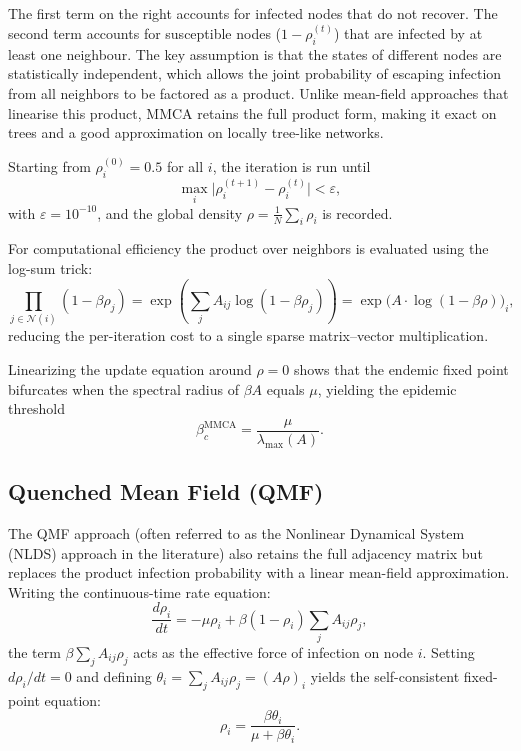 \documentclass{article}
\begin{document}
The first term on the right accounts for infected nodes that do not recover. The second term accounts for susceptible nodes ($1 - \rho_i^{(t)}$) that are infected by at least one neighbour. The key assumption is that the states of different nodes are statistically independent, which allows the joint probability of escaping infection from all neighbors to be factored as a product. Unlike mean-field approaches that linearise this product, MMCA retains the full product form, making it exact on trees and a good approximation on locally tree-like networks.

Starting from $\rho_i^{(0)} = 0.5$ for all $i$, the iteration is run until
\begin{equation}
    \max_i \bigl|\rho_i^{(t+1)} - \rho_i^{(t)}\bigr| < \varepsilon,
\end{equation}
with $\varepsilon = 10^{-10}$, and the global density $\rho = \tfrac{1}{N}\sum_i \rho_i$ is recorded.

For computational efficiency the product over neighbors is evaluated using the log-sum trick:
\begin{equation}
    \prod_{j \in \mathcal{N}(i)} (1 - \beta\rho_j)
    = \exp\!\left(\sum_j A_{ij}\log(1 - \beta\rho_j)\right)
    = \exp\!\bigl(A \cdot \log(1 - \beta\rho)\bigr)_i,
\end{equation}
reducing the per-iteration cost to a single sparse matrix--vector multiplication.

Linearizing the update equation around $\rho = 0$ shows that the endemic fixed point bifurcates when the spectral radius of $\beta A$ equals $\mu$, yielding the epidemic threshold
\begin{equation}
    \beta_c^{\text{MMCA}} = \frac{\mu}{\lambda_{\max}(A)}.
\end{equation}

\subsection{Quenched Mean Field (QMF)}\label{qmf}
The QMF approach \cite{wang2003epidemic,chakrabarti2008epidemic} (often referred to as the Nonlinear Dynamical System (NLDS) approach in the literature) also retains the full adjacency matrix but replaces the product infection probability with a linear mean-field approximation. Writing the continuous-time rate equation:
\begin{equation}
    \frac{d\rho_i}{dt} = -\mu\rho_i + \beta(1-\rho_i)\sum_j A_{ij}\rho_j,
\end{equation}
the term $\beta\sum_j A_{ij}\rho_j$ acts as the effective force of infection on node $i$. Setting $d\rho_i/dt = 0$ and defining $\theta_i = \sum_j A_{ij}\rho_j = (A\rho)_i$ yields the self-consistent fixed-point equation:
\begin{equation}
    \rho_i = \frac{\beta\theta_i}{\mu + \beta\theta_i}.
\end{equation}
\end{document}
